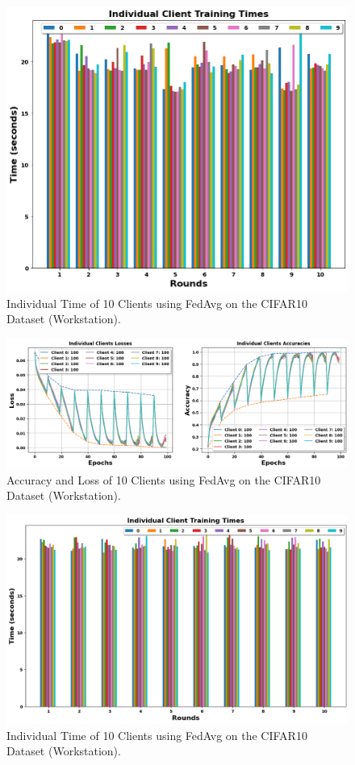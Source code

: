 \documentclass[conference]{IEEEtran}
\begin{document}
\begin{figure}[htp!]
	\centering
	\includegraphics[scale=.4]{Images/NEWGRAPHS/timechart.png }
	\caption{Individual Time of 10 Clients using FedAvg on the CIFAR10 Dataset (Workstation).}
	\label{FedAvgTimeC10}
\end{figure}

\begin{figure}[htp!]
	\centering
	\includegraphics[scale=.28]{Images/NEWGRAPHS/5.png }
	\caption{Accuracy and Loss of 10 Clients using FedAvg on the CIFAR10 Dataset (Workstation).}
	\label{FedAvgC10}
\end{figure}

\begin{figure}[htp!]
	\centering
	\includegraphics[scale=.3]{Images/NEWGRAPHS/6.png }
	\caption{Individual Time of 10 Clients using FedAvg on the CIFAR10 Dataset (Workstation).}
	\label{FedAvgTimeC10}
\end{figure}
\end{document}
